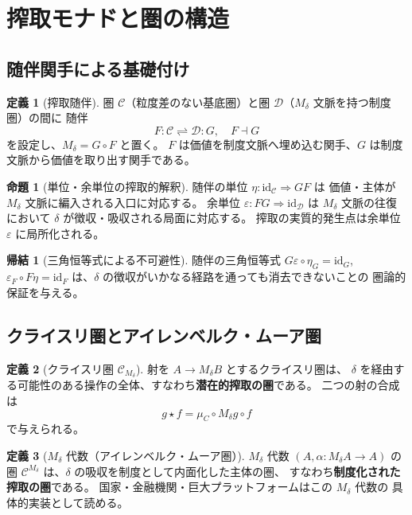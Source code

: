 \documentclass[11pt,a4paper]{ltjsarticle}
\newcommand{\Mdelta}{M_\delta}
\theoremstyle{definition}
\newtheorem{definition}{定義}[section]
\newtheorem{proposition}{命題}[section]
\newtheorem{corollary}{帰結}[section]
\begin{document}
\section{搾取モナドと圏の構造}

\subsection{随伴関手による基礎付け}

\begin{definition}[搾取随伴]
圏 $\mathcal{C}$（粒度差のない基底圏）と圏 $\mathcal{D}$（$\Mdelta$ 文脈を持つ制度圏）の間に
随伴
\[
F : \mathcal{C} \rightleftharpoons \mathcal{D} : G, \quad F \dashv G
\]
を設定し、$\Mdelta = G \circ F$ と置く。
$F$ は価値を制度文脈へ埋め込む関手、$G$ は制度文脈から価値を取り出す関手である。
\end{definition}

\begin{proposition}[単位・余単位の搾取的解釈]
随伴の単位 $\eta: \mathrm{id}_{\mathcal{C}} \Rightarrow GF$ は
価値・主体が $\Mdelta$ 文脈に編入される入口に対応する。
余単位 $\varepsilon: FG \Rightarrow \mathrm{id}_{\mathcal{D}}$ は
$\Mdelta$ 文脈の往復において $\delta$ が徴収・吸収される局面に対応する。
搾取の実質的発生点は余単位 $\varepsilon$ に局所化される。
\end{proposition}

\begin{corollary}[三角恒等式による不可避性]
随伴の三角恒等式
$G\varepsilon \circ \eta_G = \mathrm{id}_G$,
$\varepsilon_F \circ F\eta = \mathrm{id}_F$
は、$\delta$ の徴収がいかなる経路を通っても消去できないことの
圏論的保証を与える。
\end{corollary}

\subsection{クライスリ圏とアイレンベルク・ムーア圏}

\begin{definition}[クライスリ圏 $\mathcal{C}_{\Mdelta}$]
射を $A \to \Mdelta B$ とするクライスリ圏は、
$\delta$ を経由する可能性のある操作の全体、すなわち\textbf{潜在的搾取の圏}である。
二つの射の合成は
\[
g \star f = \mu_C \circ \Mdelta g \circ f
\]
で与えられる。
\end{definition}

\begin{definition}[$\Mdelta$ 代数（アイレンベルク・ムーア圏）]
$\Mdelta$ 代数 $(A, \alpha: \Mdelta A \to A)$ の圏
$\mathcal{C}^{\Mdelta}$ は、$\delta$ の吸収を制度として内面化した主体の圏、
すなわち\textbf{制度化された搾取の圏}である。
国家・金融機関・巨大プラットフォームはこの $\Mdelta$ 代数の
具体的実装として読める。
\end{definition}
\end{document}
